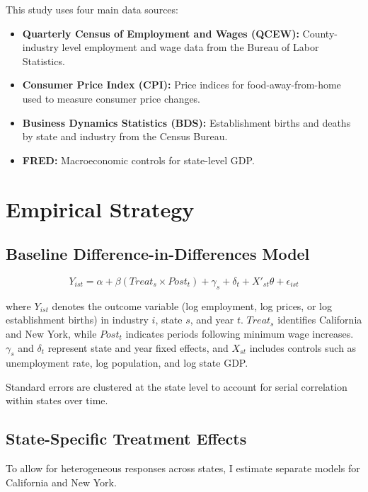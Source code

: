 \documentclass[11pt]{article}
\begin{document}
This study uses four main data sources:

\begin{itemize}
 \item \textbf{Quarterly Census of Employment and Wages (QCEW):} County-industry level employment and wage data from the Bureau of Labor Statistics.

 \item \textbf{Consumer Price Index (CPI):} Price indices for food-away-from-home used to measure consumer price changes.

 \item \textbf{Business Dynamics Statistics (BDS):} Establishment births and deaths by state and industry from the Census Bureau.

 \item \textbf{FRED:} Macroeconomic controls for state-level GDP.
\end{itemize}

\section{Empirical Strategy}

\subsection{Baseline Difference-in-Differences Model}

\[
Y_{ist} = \alpha + \beta (Treat_s \times Post_t) + \gamma_s + \delta_t + X'_{st}\theta + \epsilon_{ist}
\]

where $Y_{ist}$ denotes the outcome variable (log employment, log prices, or log establishment births) in industry $i$, state $s$, and year $t$. $Treat_s$ identifies California and New York, while $Post_t$ indicates periods following minimum wage increases. $\gamma_s$ and $\delta_t$ represent state and year fixed effects, and $X_{st}$ includes controls such as unemployment rate, log population, and log state GDP.

Standard errors are clustered at the state level to account for serial correlation within states over time.

\subsection{State-Specific Treatment Effects}

To allow for heterogeneous responses across states, I estimate separate models for California and New York.
\end{document}
